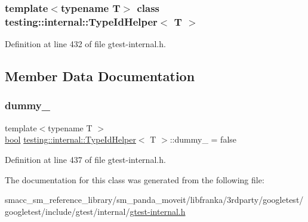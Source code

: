 \subsubsection*{template$<$typename T$>$\newline
class testing\+::internal\+::\+Type\+Id\+Helper$<$ T $>$}



Definition at line 432 of file gtest-\/internal.\+h.



\subsection{Member Data Documentation}
\mbox{\label{classtesting_1_1internal_1_1TypeIdHelper_a372268b1520d965d0bdf01ebad3d270e}} 
\subsubsection{\texorpdfstring{dummy\+\_\+}{dummy\_}}
{\footnotesize\ttfamily template$<$typename T $>$ \\
\hyperlink{classbool}{bool} \hyperlink{classtesting_1_1internal_1_1TypeIdHelper}{testing\+::internal\+::\+Type\+Id\+Helper}$<$ T $>$\+::dummy\+\_\+ = false\hspace{0.3cm}{\ttfamily [static]}}



Definition at line 437 of file gtest-\/internal.\+h.



The documentation for this class was generated from the following file\+:\begin{DoxyCompactItemize}
\item 
smacc\+\_\+sm\+\_\+reference\+\_\+library/sm\+\_\+panda\+\_\+moveit/libfranka/3rdparty/googletest/googletest/include/gtest/internal/\hyperlink{gtest-internal_8h}{gtest-\/internal.\+h}\end{DoxyCompactItemize}

